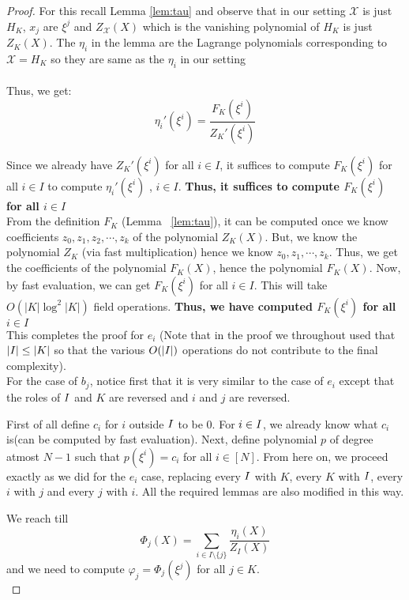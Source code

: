 \begin{proof}
    For this recall Lemma \ref{lem:tau} and observe that in our setting $\mathcal{X}$ is just $H_K$, $x_j$ are $\xi^j$ and $Z_\mathcal{X}(X)$ which is the vanishing polynomial of $H_K$ is just $Z_K(X)$. The $\eta_i$ in the lemma are the Lagrange polynomials corresponding to $\mathcal{X}=H_K$ so they are same as the $\eta_i$ in our setting\\\\
    Thus, we get:
    $$\eta_i'(\xi^i)=\frac{F_K(\xi^i)}{Z_K'(\xi^i)}$$

    Since we already have $Z_K'(\xi^i)$ for all $i \in I$,
    it suffices to compute $F_K(\xi^i)$ for all $i \in I$ to compute $\eta_i'(\xi^i)$ , $i \in I$.
    \textbf{Thus, it suffices to compute $F_K(\xi^i)$ for all $i \in I$}\\

    From the definition $F_K$ (Lemma ~\ref{lem:tau}), it can be computed once we know
    coefficients  $z_0, z_1, z_2, \cdots, z_k$ of the polynomial $Z_K(X)$.
    But, we know the polynomial $Z_K$ (via fast multiplication) hence we know $z_0, z_1, \cdots, z_{k}$.
    Thus, we get the coefficients of the polynomial $F_K(X)$, hence the polynomial $F_K(X)$.
    Now, by fast evaluation, we can get $F_K(\xi^i)$ for all $i \in I$. This will take $O(|K| \log^2|K|)$ field operations.
    \textbf{Thus, we have computed $F_K(\xi^i)$ for all $i \in I$}\\

    This completes the proof for $e_i$ (Note that in the proof we throughout used that $|I| \leq |K|$ so that the various $O(|I|)$ operations do not contribute to the final complexity).\\
    For the case of $b_j$, notice first that it is very similar to the case of $e_i$ except that the roles of $I$ and $K$ are reversed and $i$ and $j$ are reversed.

    First of all define $c_i$ for $i$ outside $I$ to be 0. For $i \in I$, we already know what $c_i$ is(can be computed by fast evaluation).
    Next, define polynomial $p$ of degree atmost $N-1$ such that $p(\xi^i)=c_i$ for all $i \in [N]$.
    From here on, we proceed exactly as we did for the $e_i$ case, replacing every $I$ with $K$, every $K$ with $I$, every $i$ with $j$ and every $j$ with $i$.
    All the required lemmas are also modified in this way.

    We reach till
    $$\Phi_j(X)=\sum_{i\in I\setminus \{j\}} \frac{\eta_i(X)}{Z_I(X)}$$
    and we need to compute $\varphi_j=\Phi_j(\xi^j)$ for all $j \in K$.\\


\end{proof}
